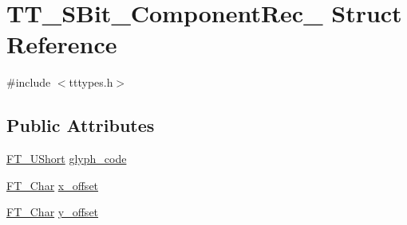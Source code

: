 \hypertarget{struct_t_t___s_bit___component_rec__}{\section{T\-T\-\_\-\-S\-Bit\-\_\-\-Component\-Rec\-\_\- Struct Reference}
\label{struct_t_t___s_bit___component_rec__}
}


{\ttfamily \#include $<$tttypes.\-h$>$}

\subsection*{Public Attributes}
\begin{DoxyCompactItemize}
\item 
\hyperlink{fttypes_8h_a937f6c17cf5ffd09086d8610c37b9f58}{F\-T\-\_\-\-U\-Short} \hyperlink{struct_t_t___s_bit___component_rec___a357eef9c05c65034b506cdd48271e562}{glyph\-\_\-code}
\item 
\hyperlink{fttypes_8h_a0f851552b050883885f0a0855771f39d}{F\-T\-\_\-\-Char} \hyperlink{struct_t_t___s_bit___component_rec___a97799704aa59bf737e274289fa70ca3f}{x\-\_\-offset}
\item 
\hyperlink{fttypes_8h_a0f851552b050883885f0a0855771f39d}{F\-T\-\_\-\-Char} \hyperlink{struct_t_t___s_bit___component_rec___af24f91b7d5e0268a223514ad68a9a10b}{y\-\_\-offset}
\end{DoxyCompactItemize}


